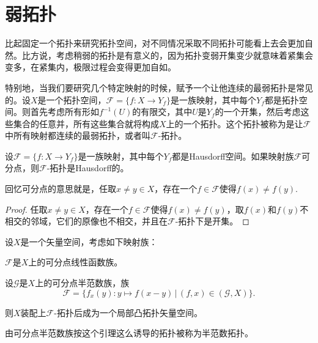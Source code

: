 \section{弱拓扑}

比起固定一个拓扑来研究拓扑空间，对不同情况采取不同拓扑可能看上去会更加自然。比方说，考虑稍弱的拓扑是有意义的，因为拓扑变弱开集变少就意味着紧集会变多，在紧集内，极限过程会变得更加自如。

特别地，当我们要研究几个特定映射的时候，赋予一个让他连续的最弱拓扑是常见的。设$X$是一个拓扑空间，$\mathscr{F}=\{f:X\to Y_f\}$是一族映射，其中每个$Y_f$都是拓扑空间。则首先考虑所有形如$f^{-1}(U)$的有限交，其中$U$是$Y_f$的一个开集，然后考虑这些集合的任意并，所有这些集合就将构成$X$上的一个拓扑。这个拓扑被称为是让$\mathscr{F}$中所有映射都连续的最弱拓扑，或者叫$\mathscr{F}$-拓扑。

\begin{pro}
设$\mathscr{F}=\{f:X\to Y_f\}$是一族映射，其中每个$Y_f$都是Hausdorff空间。如果映射族$\mathscr{F}$可分点，则$\mathscr{F}$-拓扑是Hausdorff的。
\end{pro}

回忆可分点的意思就是，任取$x\neq y\in X$，存在一个$f\in \mathscr{F}$使得$f(x)\neq f(y)$.

\begin{proof}
任取$x\neq y\in X$，存在一个$f\in \mathscr{F}$使得$f(x)\neq f(y)$，取$f(x)$和$f(y)$不相交的邻域，它们的原像也不相交，并且在$\mathscr{F}$-拓扑下是开集。
\end{proof}

\begin{lem}\label{lem:1.45}设$X$是一个矢量空间，考虑如下映射族：
\begin{compactenum}[~~~(1)]
\item $\mathscr{F}$是$X$上的可分点线性函数族。
\item 设$\mathscr{G}$是$X$上的可分点半范数族，族
\[
	\mathscr{F}=\{f_x(y):y\mapsto f(x-y)\,|\,(f,x)\in (\mathscr{G},X)\}.
\]
\end{compactenum}
则$X$装配上$\mathscr{F}$-拓扑后成为一个局部凸拓扑矢量空间。
\end{lem}

由可分点半范数族按这个引理这么诱导的拓扑被称为半范数拓扑。

